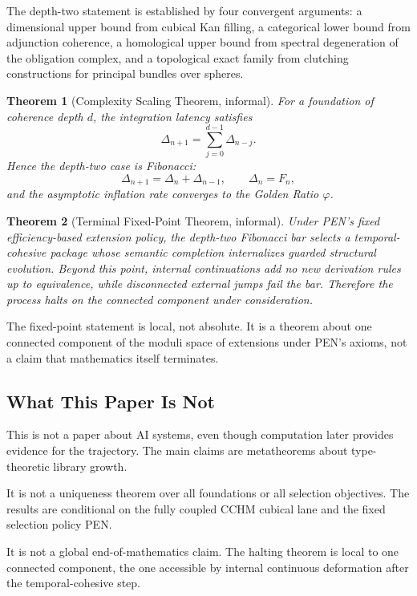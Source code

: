 \documentclass[11pt,a4paper]{article}
\theoremstyle{plain}
\newtheorem{theorem}{Theorem}[section]
\theoremstyle{definition}
\theoremstyle{remark}
\begin{document}
The depth-two statement is established by four convergent arguments: a dimensional upper bound from cubical Kan filling, a categorical lower bound from adjunction coherence, a homological upper bound from spectral degeneration of the obligation complex, and a topological exact family from clutching constructions for principal bundles over spheres.

\begin{theorem}[Complexity Scaling Theorem, informal]
For a foundation of coherence depth $d$, the integration latency satisfies
\[
  \Delta_{n+1}=\sum_{j=0}^{d-1}\Delta_{n-j}.
\]
Hence the depth-two case is Fibonacci:
\[
  \Delta_{n+1}=\Delta_n+\Delta_{n-1},\qquad \Delta_n=F_n,
\]
and the asymptotic inflation rate converges to the Golden Ratio $\varphi$.
\end{theorem}

\begin{theorem}[Terminal Fixed-Point Theorem, informal]
Under PEN's fixed efficiency-based extension policy, the depth-two Fibonacci bar selects a temporal-cohesive package whose semantic completion internalizes guarded structural evolution.  Beyond this point, internal continuations add no new derivation rules up to equivalence, while disconnected external jumps fail the bar.  Therefore the process halts on the connected component under consideration.
\end{theorem}

The fixed-point statement is local, not absolute.  It is a theorem about one connected component of the moduli space of extensions under PEN's axioms, not a claim that mathematics itself terminates.

\subsection{What This Paper Is Not}

This is not a paper about AI systems, even though computation later provides evidence for the trajectory.  The main claims are metatheorems about type-theoretic library growth.

It is not a uniqueness theorem over all foundations or all selection objectives.  The results are conditional on the fully coupled CCHM cubical lane and the fixed selection policy PEN.

It is not a global end-of-mathematics claim.  The halting theorem is local to one connected component, the one accessible by internal continuous deformation after the temporal-cohesive step.
\end{document}
